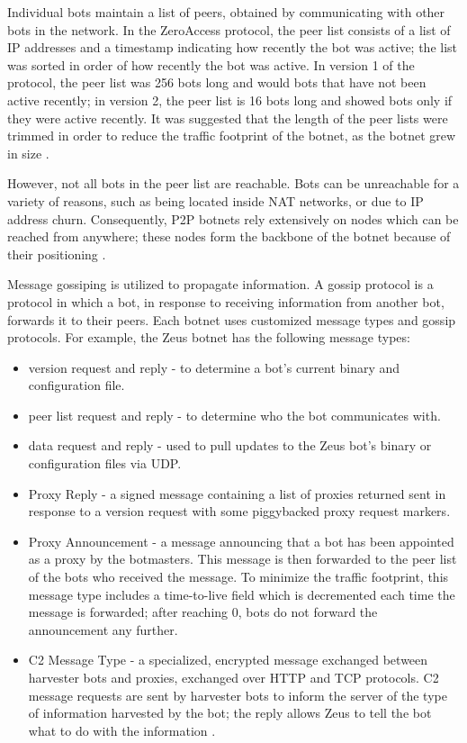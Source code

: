 \documentclass{acm_proc_article-sp}
\begin{document}
Individual bots maintain a list of peers, obtained by communicating with other bots in the network.  In the ZeroAccess protocol, the peer list consists of a list of IP addresses and a timestamp indicating how recently the bot was active; the list was sorted in order of how recently the bot was active. In version 1 of the protocol, the peer list was 256 bots long and would bots that have not been active recently; in version 2, the peer list is 16 bots long and showed bots only if they were active recently.  It was suggested that the length of the peer lists were trimmed in order to reduce the traffic footprint of the botnet, as the botnet grew in size  \cite{defcon:prowling}.  

However, not all bots in the peer list are reachable.  Bots can be unreachable for a variety of reasons, such as being located inside NAT networks, or due to IP address churn.   Consequently, P2P botnets rely extensively on nodes which can be reached from anywhere; these nodes form the backbone of the botnet because of their positioning \cite{defcon:prowling}.

Message gossiping is utilized to propagate information\cite{stone:p2p}. A gossip protocol is a protocol in which a bot, in response to receiving information from another bot, forwards it to their peers. Each botnet uses customized message types and gossip protocols. For example, the Zeus botnet has the following message types:\cite{zeus:protocol}
\begin{itemize}
\item version request and reply - to determine a bot's current binary and configuration file\cite{zeus:protocol}.
\item peer list request and reply - to determine who the bot communicates with\cite{zeus:protocol}.
\item data request and reply - used to pull updates to the Zeus bot's binary or configuration files via UDP\cite{zeus:protocol}.
\item Proxy Reply - a signed message containing a list of proxies returned sent in response to a version request with some piggybacked proxy request markers\cite{zeus:protocol}.
\item Proxy Announcement - a message announcing that a bot has been appointed as a proxy by the botmasters.  This message is then forwarded to the peer list of the bots who received the message.  To minimize the traffic footprint, this message type includes a time-to-live field which is decremented each time the message is forwarded; after reaching 0, bots do not forward the announcement any further\cite{zeus:protocol}.
\item C2 Message Type - a specialized, encrypted message exchanged between harvester bots and proxies, exchanged over HTTP and TCP protocols.  C2 message requests are sent by harvester bots to inform the server of the type of information harvested by the bot; the reply allows Zeus to tell the bot what to do with the information \cite{zeus:protocol}.
\end{itemize}
\end{document}
